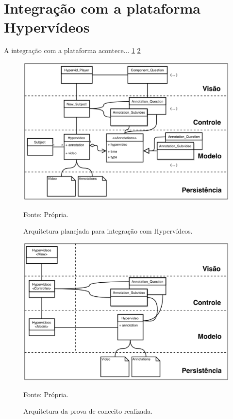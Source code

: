 \section{Integração com a plataforma Hypervídeos}

A integração com a plataforma acontece... \ref{fig:arquitetura_final} \ref{fig:arquitetura_probe}

\begin{figure}[h!]
	\centering
  	\includegraphics[width=.9\linewidth]{figuras/arquitetura.eps}
  	\caption{Arquitetura planejada para integração com Hypervídeos.}
	\small{Fonte: Própria.}
  	\label{fig:arquitetura_final}
\end{figure} 

\begin{figure}[h!]
	\centering
  	\includegraphics[width=.9\linewidth]{figuras/arquitetura_simpler.eps}
  	\caption{Arquitetura da prova de conceito realizada.}
	\small{Fonte: Própria.}
  	\label{fig:arquitetura_probe}
\end{figure} 